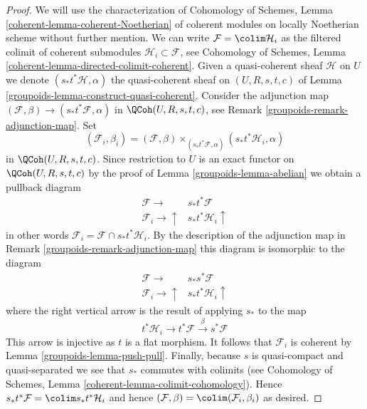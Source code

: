 \begin{proof}

We will use the characterization of Cohomology of Schemes, Lemma
\ref{coherent-lemma-coherent-Noetherian} of coherent modules on locally
Noetherian scheme without further mention. We can write
$\mathcal{F} = \colim \mathcal{H}_i$ as the filtered colimit
of coherent submodules $\mathcal{H}_i \subset \mathcal{F}$, see
Cohomology of Schemes, Lemma \ref{coherent-lemma-directed-colimit-coherent}.
Given a quasi-coherent sheaf $\mathcal{H}$ on $U$ we denote
$(s_*t^*\mathcal{H}, \alpha)$ the quasi-coherent sheaf on $(U, R, s, t, c)$ of
Lemma \ref{groupoids-lemma-construct-quasi-coherent}. Consider the adjunction map
$(\mathcal{F}, \beta) \to (s_*t^*\mathcal{F}, \alpha)$ in
$\QCoh(U, R, s, t, c)$, see Remark \ref{groupoids-remark-adjunction-map}.
Set
$$
(\mathcal{F}_i, \beta_i) =
(\mathcal{F}, \beta)
\times_{(s_*t^*\mathcal{F}, \alpha)}
(s_*t^*\mathcal{H}_i, \alpha)
$$
in $\QCoh(U, R, s, t, c)$. Since restriction to $U$ is an exact functor
on $\QCoh(U, R, s, t, c)$  by the proof of Lemma \ref{groupoids-lemma-abelian}
we obtain a pullback diagram
$$
\begin{array}{cc}\mathcal{F} \longrightarrow & s_*t^*\mathcal{F} \\ \mathcal{F}_i \longrightarrow\uparrow & s_*t^*\mathcal{H}_i \uparrow\end{array}
$$
in other words $\mathcal{F}_i = \mathcal{F} \cap s_*t^*\mathcal{H}_i$.
By the description of the adjunction map in Remark \ref{groupoids-remark-adjunction-map}
this diagram is isomorphic to the diagram
$$
\begin{array}{cc}\mathcal{F} \longrightarrow & s_*s^*\mathcal{F} \\ \mathcal{F}_i \longrightarrow\uparrow & s_*t^*\mathcal{H}_i \uparrow\end{array}
$$
where the right vertical arrow is the result of applying $s_*$ to the map
$$
t^*\mathcal{H}_i \to t^*\mathcal{F} \xrightarrow{\beta} s^*\mathcal{F}
$$
This arrow is injective as $t$ is a flat morphism. It follows that
$\mathcal{F}_i$ is coherent by Lemma \ref{groupoids-lemma-push-pull}.
Finally, because $s$ is quasi-compact and quasi-separated we see that
$s_*$ commutes with colimits (see
Cohomology of Schemes, Lemma \ref{coherent-lemma-colimit-cohomology}).
Hence $s_*t^*\mathcal{F} = \colim s_*t^*\mathcal{H}_i$ and hence
$(\mathcal{F}, \beta) = \colim (\mathcal{F}_i, \beta_i)$ as desired.
\end{proof}

